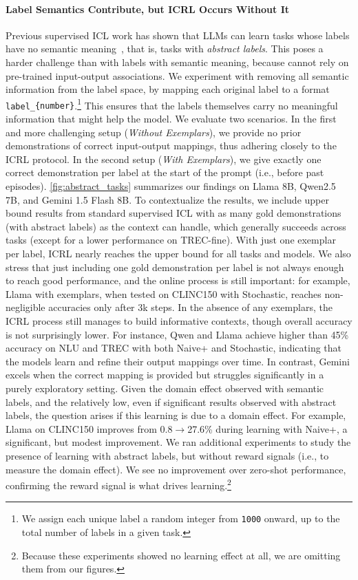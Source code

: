 \documentclass{article}
\theoremstyle{plain}
\theoremstyle{definition}
\theoremstyle{remark}
\newcommand{\llama}{Llama\xspace}
\newcommand{\qwen}{Qwen\xspace}
\newcommand{\gemini}{Gemini\xspace}
\newcommand{\clinic}{CLINC150\xspace}
\newcommand{\trec}{TREC\xspace}
\newcommand{\trecfine}{TREC-fine\xspace}
\newcommand{\nlu}{NLU\xspace}
\newcommand{\naiveplusshort}{Naive+\xspace}
\newcommand{\expshort}{Stochastic\xspace}
\begin{document}
\paragraph{Label Semantics Contribute, but ICRL Occurs Without It }
Previous supervised ICL work has shown that LLMs can learn tasks whose labels have no semantic meaning~\citep{pan-etal-2023-context, li2024languagemodelslearncontext}, that is, tasks with \textit{abstract labels}.
This poses a harder challenge than with labels with semantic meaning, because cannot rely on pre-trained input-output associations.
We experiment with removing all semantic information from the label space, by mapping each original label to a format \texttt{label\_{\{number\}}}.\footnote{We assign each unique label a random integer from \texttt{1000} onward, up to the total number of labels in a given task.} This ensures that the labels themselves carry no meaningful information that might help the model.
We evaluate two scenarios. In the first and more challenging setup (\textit{Without Exemplars}), we provide no prior demonstrations of correct input-output mappings, thus adhering closely to the ICRL protocol. In the second setup (\textit{With Exemplars}), we give exactly one correct demonstration per label at the start of the prompt (i.e., before past episodes).
\autoref{fig:abstract_tasks} summarizes our findings on \llama 8B, \qwen{2.5} 7B, and \gemini 1.5 Flash 8B.
To contextualize the results, we include upper bound results from standard supervised ICL with as many gold demonstrations (with abstract labels) as the context can handle, which generally succeeds across tasks (except for a lower performance on \trecfine).
With just one exemplar per label, ICRL nearly reaches the upper bound for all tasks and models. We also stress that just including one gold demonstration per label is not always enough to reach good performance, and the online process is still important: for example, \llama with exemplars, when tested on \clinic with \expshort, reaches non-negligible accuracies only after 3k steps.  In the absence of any exemplars, the ICRL process still manages to build informative contexts, though overall accuracy is not surprisingly lower.
For instance, \qwen and \llama achieve higher than 45\% accuracy on \nlu and \trec with both \naiveplusshort and \expshort, indicating that the models learn and refine their output mappings over time. In contrast, \gemini excels when the correct mapping is provided but struggles significantly in a purely exploratory setting.
Given the domain effect observed with semantic labels, and the relatively low, even if significant results observed with abstract labels, the question arises if this learning is due to a domain effect.
For example, \llama on \clinic improves from 0.8$\rightarrow$27.6\% during learning with \naiveplusshort, a significant, but modest improvement.
We ran additional experiments to study the presence of learning with abstract labels, but without reward signals (i.e., to measure the domain effect). We see no improvement over zero-shot performance, confirming the reward signal is what drives learning.\footnote{Because these experiments showed no learning effect at all, we are omitting them from our figures.}
\end{document}
